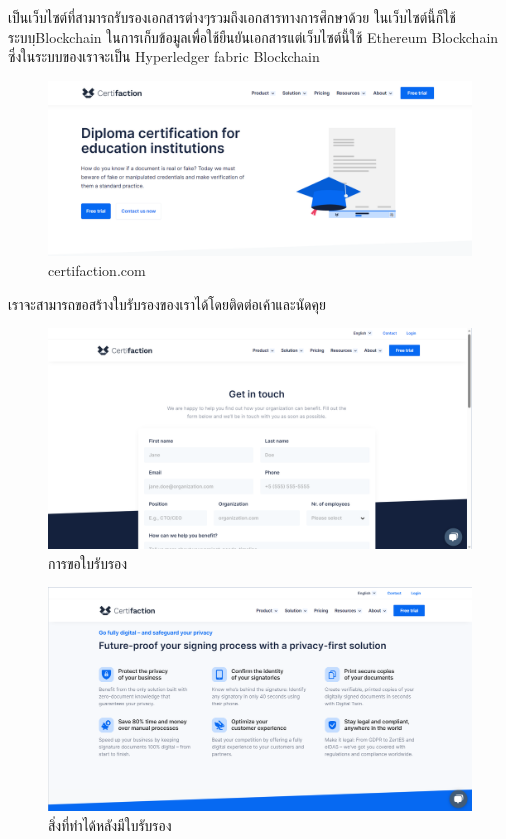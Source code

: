 \enskip \enskip \enskip 
เป็นเว็บไซต์ที่สามารถรับรองเอกสารต่างๆรวมถึงเอกสารทางการศึกษาด้วย
ในเว็บไซต์นี้ก็ใช้ระบบฺBlockchain ในการเก็บข้อมูลเพื่อใช้ยืนยันเอกสารแต่เว็บไซต์นี้ใช้
Ethereum Blockchain ซึ่งในระบบของเราจะเป็น Hyperledger fabric Blockchain
\graphicspath{ {./images/} }
\begin{figure}[htbp]
  \centering 
  \includegraphics[scale=0.3]{certifi_1.png}
  \caption[certifaction.com]{certifaction.com}
  \label{certifi_1}
\end{figure}

เราจะสามารถขอสร้างใบรับรองของเราได้โดยติดต่อเค้าและนัดคุย

\enskip \enskip \enskip 
\graphicspath{ {./images/} }
\begin{figure}[htbp]
  \centering 
  \includegraphics[scale=0.3]{certifi_2.png}
  \caption[การขอใบรับรอง]{การขอใบรับรอง}
  \label{certifi_2}
\end{figure}


\enskip \enskip \enskip 
\graphicspath{ {./images/} }
\begin{figure}[htbp]
  \centering 
  \includegraphics[scale=0.3]{certifi_3.png}
  \caption[สิ่งที่ทำได้หลังมีใบรับรอง]{สิ่งที่ทำได้หลังมีใบรับรอง}
  \label{certifi_3}
\end{figure}

